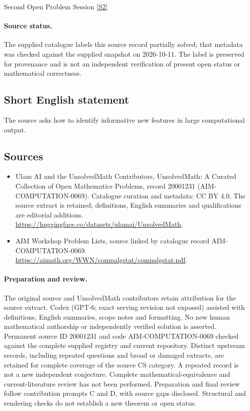 \documentclass[11pt]{article}
\newcommand{\sref}[2]{\hyperlink{source:#1:#2}{[S#2]}}
\begin{document}
Second Open Problem Session \sref{20001231}{2}
\paragraph{Source status.}
The supplied catalogue labels this source record partially solved; that metadata was checked against the supplied snapshot on 2026-10-11. The label is preserved for provenance and is not an independent verification of present open status or mathematical correctness.
\subsection{Short English statement}
The source asks how to identify informative new features in large computational output.
\subsection{Sources}
\begin{itemize}
\item[\hypertarget{source:20001231:1}{S1}] Ulam AI and the UnsolvedMath Contributors, UnsolvedMath: A Curated Collection of Open Mathematics Problems, record 20001231 (AIM-COMPUTATION-0069). Catalogue curation and metadata: CC BY 4.0. The source extract is retained; definitions, English summaries and qualifications are editorial additions.
\url{https://huggingface.co/datasets/ulamai/UnsolvedMath}.
\item[\hypertarget{source:20001231:2}{S2}] AIM Workshop Problem Lists, source linked by catalogue record AIM-COMPUTATION-0069.
\url{https://aimath.org/WWN/compalgstat/compalgstat.pdf}.
\end{itemize}
\paragraph{Preparation and review.}
The original source and UnsolvedMath contributors retain attribution for the source extract. Codex (GPT-6; exact serving revision not exposed) assisted with definitions, English summaries, scope notes and formatting. No new human mathematical authorship or independently verified solution is asserted. Permanent source ID 20001231 and code AIM-COMPUTATION-0069 checked against the complete supplied registry and current repository. Distinct upstream records, including repeated questions and broad or damaged extracts, are retained for complete coverage of the source CS category. A repeated record is not a new independent conjecture. Complete mathematical-equivalence and current-literature review has not been performed. Preparation and final review follow contribution prompts C and D, with source gaps disclosed. Structural and rendering checks do not establish a new theorem or open status.
\label{end:20001231}
\end{document}
